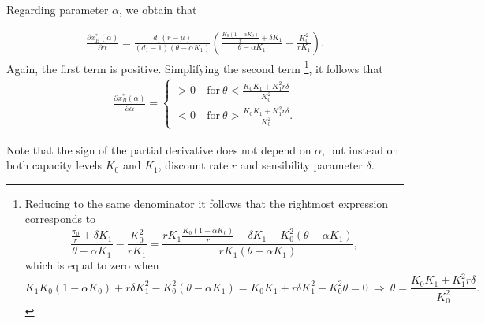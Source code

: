 Regarding parameter $\alpha$, we obtain that

\begin{align*}
\frac{\partial x^*_B ( \alpha ) }{\partial \alpha}= 
\frac{d_1 (r-\mu )}{ (d_1-1)(\theta-\alpha K_1)}  \left( \frac{\frac{K_0(1-\alpha K_0)}{r}+ \delta K_1  }{\theta-\alpha K_1} -\frac{ K_0^2}{r K_1} \right).
\end{align*}
Again, the first term is positive. Simplifying the second term
\footnote{Reducing to the same denominator it follows that the rightmost expression corresponds to
	$$\frac{\frac{\pi_0}{r}+ \delta K_1  }{\theta-\alpha K_1} -\frac{ K_0^2}{r K_1} =
	\frac{r K_1 \frac{K_0(1-\alpha K_0)}{r}+ \delta K_1  -K_0^2(\theta-\alpha K_1)}{r K_1(\theta-\alpha K_1)},$$
	which is equal to zero when
	$$  K_1 K_0(1-\alpha K_0)+ r\delta K_1^2  -K_0^2(\theta-\alpha K_1)= K_0K_1+r\delta K_1^2-K_0^2 \theta=0 \ \Rightarrow \ \theta=\frac{K_0 K_1 +K_1^2 r\delta}{K_0^2}.
	$$
	},
it follows that
\begin{align*}
\frac{\partial x^*_B ( \alpha ) }{\partial \alpha}= 
\begin{cases}
>0 &\ \text{for} \ \theta < \frac{K_0 K_1 +K_1^2 r\delta}{K_0^2}\\
<0 &\ \text{for} \ \theta > \frac{K_0 K_1 +K_1^2 r\delta}{K_0^2}.
\end{cases}
\end{align*}

Note that the sign of the partial derivative does not depend on $\alpha$, but instead on both capacity levels $K_0$ and $K_1$, discount rate $r$ and sensibility parameter $\delta$.


